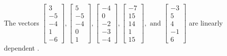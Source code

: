 \begin{exercise}
\begin{exerciseStatement}
  \end{exerciseStatement}
  \begin{exerciseAnswer}
   The vectors \(\left[\begin{array}{r}
3 \\
-5 \\
-4 \\
1 \\
-6
\end{array}\right] , \left[\begin{array}{r}
5 \\
-5 \\
-4 \\
0 \\
1
\end{array}\right] , \left[\begin{array}{r}
-4 \\
0 \\
-2 \\
-3 \\
-4
\end{array}\right] , \left[\begin{array}{r}
-7 \\
15 \\
14 \\
1 \\
15
\end{array}\right] , \text{ and } \left[\begin{array}{r}
-3 \\
5 \\
4 \\
-1 \\
6
\end{array}\right]\) are 
  	 linearly dependent  .
  


  \end{exerciseAnswer}
\end{exercise}